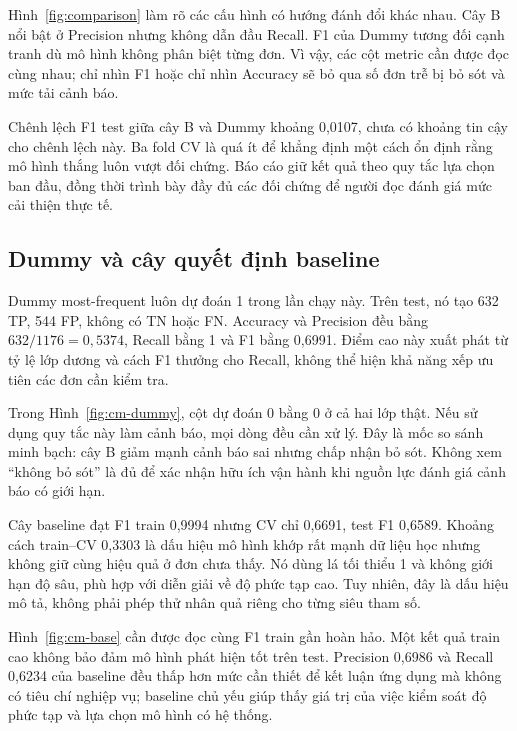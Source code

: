 Hình~\ref{fig:comparison} làm rõ các cấu hình có hướng đánh đổi khác nhau.
Cây B nổi bật ở Precision nhưng không dẫn đầu Recall. F1 của Dummy tương
đối cạnh tranh dù mô hình không phân biệt từng đơn. Vì vậy, các cột metric
cần được đọc cùng nhau; chỉ nhìn F1 hoặc chỉ nhìn Accuracy sẽ bỏ qua số
đơn trễ bị bỏ sót và mức tải cảnh báo.

Chênh lệch F1 test giữa cây B và Dummy khoảng 0,0107, chưa có khoảng tin
cậy cho chênh lệch này. Ba fold CV là quá ít để khẳng định một cách ổn định
rằng mô hình thắng luôn vượt đối chứng. Báo cáo giữ kết quả theo quy tắc
lựa chọn ban đầu, đồng thời trình bày đầy đủ các đối chứng để người đọc
đánh giá mức cải thiện thực tế.

\subsection{Dummy và cây quyết định baseline}
Dummy most-frequent luôn dự đoán 1 trong lần chạy này. Trên test, nó tạo
632 TP, 544 FP, không có TN hoặc FN. Accuracy và Precision đều bằng
$632/1176=0{,}5374$, Recall bằng 1 và F1 bằng 0,6991. Điểm cao này xuất
phát từ tỷ lệ lớp dương và cách F1 thưởng cho Recall, không thể hiện khả
năng xếp ưu tiên các đơn cần kiểm tra.

Trong Hình~\ref{fig:cm-dummy}, cột dự đoán 0 bằng 0 ở cả hai lớp thật.
Nếu sử dụng quy tắc này làm cảnh báo, mọi dòng đều cần xử lý. Đây là mốc
so sánh minh bạch: cây B giảm mạnh cảnh báo sai nhưng chấp nhận bỏ sót.
Không xem ``không bỏ sót'' là đủ để xác nhận hữu ích vận hành khi nguồn lực
đánh giá cảnh báo có giới hạn.

Cây baseline đạt F1 train 0,9994 nhưng CV chỉ 0,6691, test F1 0,6589.
Khoảng cách train--CV 0,3303 là dấu hiệu mô hình khớp rất mạnh dữ liệu
học nhưng không giữ cùng hiệu quả ở đơn chưa thấy. Nó dùng lá tối thiểu
1 và không giới hạn độ sâu, phù hợp với diễn giải về độ phức tạp cao.
Tuy nhiên, đây là dấu hiệu mô tả, không phải phép thử nhân quả riêng cho
từng siêu tham số.

Hình~\ref{fig:cm-base} cần được đọc cùng F1 train gần hoàn hảo. Một kết
quả train cao không bảo đảm mô hình phát hiện tốt trên test. Precision
0,6986 và Recall 0,6234 của baseline đều thấp hơn mức cần thiết để kết
luận ứng dụng mà không có tiêu chí nghiệp vụ; baseline chủ yếu giúp thấy
giá trị của việc kiểm soát độ phức tạp và lựa chọn mô hình có hệ thống.

